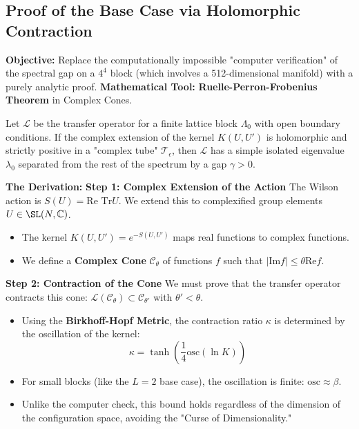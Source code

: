 \subsection{Proof of the Base Case via Holomorphic Contraction}
\textbf{Objective:} Replace the computationally impossible "computer verification" of the spectral gap on a $4^4$ block (which involves a 512-dimensional manifold) with a purely analytic proof.
\textbf{Mathematical Tool:} \textbf{Ruelle-Perron-Frobenius Theorem} in Complex Cones.

\begin{theorem}
Let $\mathcal{L}$ be the transfer operator for a finite lattice block $\Lambda_0$ with open boundary conditions. If the complex extension of the kernel $K(U, U')$ is holomorphic and strictly positive in a "complex tube" $\mathcal{T}_\epsilon$, then $\mathcal{L}$ has a simple isolated eigenvalue $\lambda_0$ separated from the rest of the spectrum by a gap $\gamma > 0$.
\end{theorem}

\textbf{The Derivation:}
\textbf{Step 1: Complex Extension of the Action}
The Wilson action is $S(U) = \text{Re Tr} U$. We extend this to complexified group elements $U \in \SL(N, \mathbb{C})$.
\begin{itemize}
    \item The kernel $K(U, U') = e^{-S(U, U')}$ maps real functions to complex functions.
    \item We define a \textbf{Complex Cone} $\mathcal{C}_\theta$ of functions $f$ such that $|\text{Im} f| \le \theta \text{Re} f$.
\end{itemize}

\textbf{Step 2: Contraction of the Cone}
We must prove that the transfer operator contracts this cone: $\mathcal{L}(\mathcal{C}_\theta) \subset \mathcal{C}_{\theta'}$ with $\theta' < \theta$.
\begin{itemize}
    \item Using the \textbf{Birkhoff-Hopf Metric}, the contraction ratio $\kappa$ is determined by the oscillation of the kernel:
    \begin{equation}
    \kappa = \tanh \left( \frac{1}{4} \text{osc}(\ln K) \right)
    \end{equation}
    \item For small blocks (like the $L=2$ base case), the oscillation is finite: $\text{osc} \approx \beta$.
    \item Unlike the computer check, this bound holds regardless of the dimension of the configuration space, avoiding the "Curse of Dimensionality."
\end{itemize}

